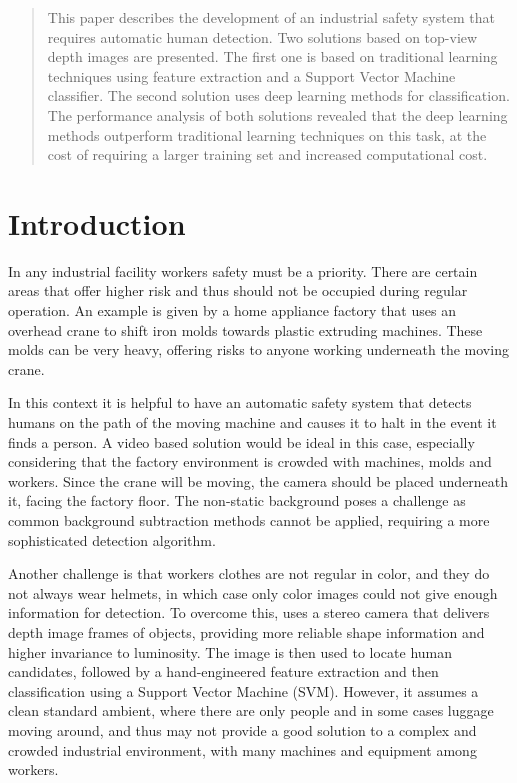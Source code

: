 \begin{abstract}
This paper describes the development of an industrial safety system that requires automatic human detection. Two solutions based on top-view depth images are presented. The first one is based on traditional learning techniques using feature extraction and a Support Vector Machine classifier. The second solution uses deep learning methods for classification. The performance analysis of both solutions revealed that the deep learning methods outperform traditional learning techniques on this task, at the cost of requiring a larger training set and increased computational cost.
\end{abstract}

\section{Introduction}
  In any industrial facility workers safety must be a priority. There are certain areas that offer higher risk and thus should not be occupied during regular operation. An example is given by a home appliance factory that uses an overhead crane to shift iron molds towards plastic extruding machines. These molds can be very heavy, offering risks to anyone working underneath the moving crane.

  In this context it is helpful to have an automatic safety system that detects humans on the path of the moving machine and causes it to halt in the event it finds a person. A video based solution would be ideal in this case, especially considering that the factory environment is crowded with machines, molds and workers. Since the crane will be moving, the camera should be placed underneath it, facing the factory floor. The non-static background poses a challenge as common background subtraction methods cannot be applied, requiring a more sophisticated detection algorithm.

  Another challenge is that workers clothes are not regular in color, and they do not always wear helmets, in which case only color images could not give enough information for detection. To overcome this, \cite{rauter} uses a stereo camera that delivers depth image frames of objects, providing more reliable shape information and higher invariance to luminosity. The image is then used to locate human candidates, followed by a hand-engineered feature extraction and then classification using a Support Vector Machine (SVM). However, it assumes a clean standard ambient, where there are only people and in some cases luggage moving around, and thus may not provide a good solution to a complex and crowded industrial environment, with many machines and equipment among workers.

